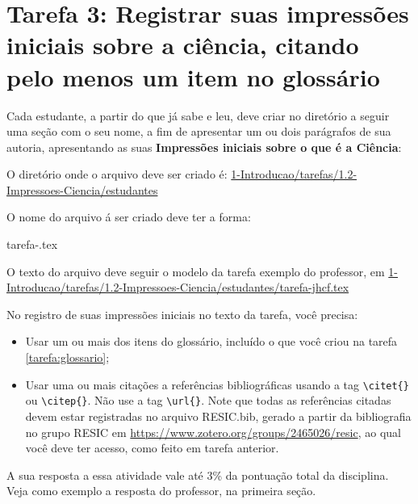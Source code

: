 \section{Tarefa 3: Registrar suas impressões iniciais sobre a ciência, citando pelo menos  um item no glossário}

Cada estudante, a partir do que já sabe e leu, deve criar no diretório a seguir uma seção com o seu nome, a fim de apresentar um ou dois parágrafos de sua autoria, apresentando as suas \textbf{Impressões iniciais sobre o que é a Ciência}: 

O diretório onde o arquivo deve ser criado é: 
\url{1-Introducao/tarefas/1.2-Impressoes-Ciencia/estudantes}

O nome do arquivo á ser criado deve ter a forma:
\begin{itquote}

tarefa-\githubusername.tex
    
\end{itquote}

O texto do arquivo deve seguir o modelo da tarefa exemplo do professor, em
\url{1-Introducao/tarefas/1.2-Impressoes-Ciencia/estudantes/tarefa-jhcf.tex}

No registro de suas impressões iniciais no texto da tarefa, você precisa:
\begin{itemize}
    \item Usar um ou mais dos itens do glossário, incluído o que você criou na tarefa \ref{tarefa:glossario};
    \item Usar uma ou mais citações a referências bibliográficas usando a tag \verb|\citet{}| ou \verb|\citep{}|. Não use a tag \verb|\url{}|. Note que todas as referências citadas devem estar registradas no arquivo RESIC.bib, gerado a partir da bibliografia no grupo RESIC em \url{https://www.zotero.org/groups/2465026/resic}, ao qual você deve ter acesso, como feito em tarefa anterior.
\end{itemize}

A sua resposta a essa atividade vale até 3\% da pontuação total da disciplina.
Veja como exemplo a resposta do professor, na primeira seção.


